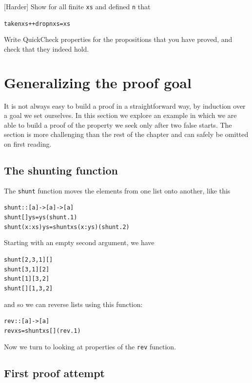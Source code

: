 \begin{exercises}
\item
\mbox{[Harder]} Show for all finite \texttt{xs} and defined \texttt{n} that
\begin{alltt}
take n xs ++ drop n xs = xs
\end{alltt}


\item
Write QuickCheck properties for the propositions that you have proved, and check that they indeed hold.

\end{exercises}


\section{Generalizing the proof goal}
\label{genPrf}

It is not always easy to build a proof in a straightforward way, by induction
over a goal we set ourselves. In this section we explore an example in which
we are able to build a proof of the property we
seek only after two false starts. 
The section is more challenging than the rest of the chapter and can safely
be omitted on first reading.


\subsection*{The shunting function}

The \texttt{shunt} function moves the elements from one list onto another, like this
\begin{alltt}
shunt :: [a] -> [a] -> [a]
\bl
shunt []     ys = ys\hfill (shunt.1)
shunt (x:xs) ys = shunt xs (x:ys) \hfill (shunt.2)
\end{alltt}
Starting with an empty second argument, we have
\begin{alltt}
shunt [2,3,1] []
\step shunt [3,1] [2]
\step shunt [1] [3,2]
\step shunt [] [1,3,2]
\step [1,3,2]
\end{alltt}
and so we can reverse lists using this function:
\begin{alltt}
rev :: [a] -> [a]
rev xs = shunt xs []\hfill (rev.1)
\end{alltt}
Now we turn to looking at properties of the \texttt{rev} function.

\subsection*{First proof attempt}

